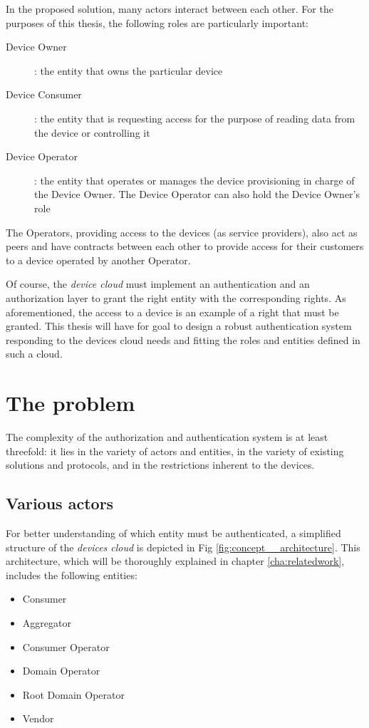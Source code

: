 In the proposed solution, many actors interact between each other. For the purposes of this thesis, the following roles are particularly important:

\begin{description}
	\item[Device Owner]: the entity that owns the particular device
	\item[Device Consumer]: the entity that is requesting access for the purpose of reading data from the device or controlling it
	\item[Device Operator]: the entity that operates or manages the device provisioning in charge of the Device Owner. The Device Operator can also hold the Device Owner's role
\end{description}

The Operators, providing access to the devices (as service providers), also act as peers and have contracts between each other to provide access for their customers to a device operated by another Operator.

Of course, the \emph{device cloud} must implement an authentication and an authorization layer to grant the right entity with the corresponding rights. As aforementioned, the access to a device is an example of a right that must be granted. This thesis will have for goal to design a robust authentication system responding to the devices cloud needs and fitting the roles and entities defined in such a cloud. 


\section{The problem}
The complexity of the authorization and authentication system is at least threefold: it lies in the variety of actors and entities, in the variety of existing solutions and protocols, and in the restrictions inherent to the devices.

\subsection{Various actors} 
For better understanding of which entity must be authenticated, a simplified structure of the \emph{devices cloud} is depicted in Fig \ref*{fig:concept__architecture}. This architecture, which will be thoroughly explained in chapter \ref{cha:relatedwork}, includes the following entities:
\begin{itemize}
	\item Consumer
	\item Aggregator
	\item Consumer Operator
	\item Domain Operator
	\item Root Domain Operator
	\item Vendor
\end{itemize}

